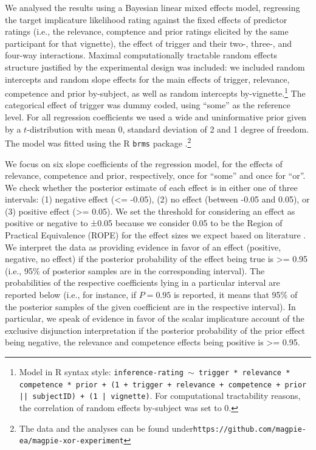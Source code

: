 \documentclass{sp}
\begin{document}
We analysed the results using a Bayesian linear mixed effects model, regressing the target implicature likelihood rating against the fixed effects of predictor ratings (i.e., the relevance, comptence and prior ratings elicited by the same participant for that vignette), the effect of trigger and their two-, three-, and four-way interactions. Maximal computationally tractable random effects structure justified by the experimental design was included: we included random intercepts and random slope effects for the main effects of trigger, relevance, competence and prior by-subject, as well as random intercepts by-vignette.\footnote{Model in R syntax style: \texttt{inference-rating $\sim$ trigger * relevance * competence * prior + (1 + trigger + relevance + competence + prior || subjectID) + (1 | vignette)}. For computational tractability reasons, the correlation of random effects by-subject was set to 0.} 
The categorical effect of trigger was dummy coded, using ``some'' as the reference level. For all regression coefficients we used a wide and uninformative prior given by a $t$-distribution with mean 0, standard deviation of 2 and 1 degree of freedom. The model was fitted using the R \texttt{brms} package \citep{burkner2017brms}.\footnote{The data and the analyses can be found under\newline \texttt{https://github.com/magpie-ea/magpie-xor-experiment}}

We focus on six slope coefficients of the regression model, for the effects of relevance, competence and prior, respectively, once for ``some'' and once for ``or''. We check whether the posterior estimate of each effect is in either one of three intervals: (1) negative effect (<= -0.05), (2) no effect (between -0.05 and 0.05), or (3) positive effect (>= 0.05). We set the threshold for considering an effect as positive or negative to ±0.05 because we consider 0.05 to be the Region of Practical Equivalence (ROPE) for the effect sizes we expect based on literature \citep{kruschke2014doing}.
We interpret the data as providing evidence in favor of an effect (positive, negative, no effect) if the posterior probability of the effect being true is >= 0.95 (i.e., 95\% of posterior samples are in the corresponding interval). The probabilities of the respective coefficients lying in a particular interval are reported below (i.e., for instance, if $P=0.95$ is reported, it means that 95\% of the posterior samples of the given coefficient are in the respective interval). In particular, we speak of evidence in favor of the scalar implicature account of the exclusive disjunction interpretation if the posterior probability of the prior effect being negative, the relevance and competence effects being positive is >= 0.95. 
\end{document}
